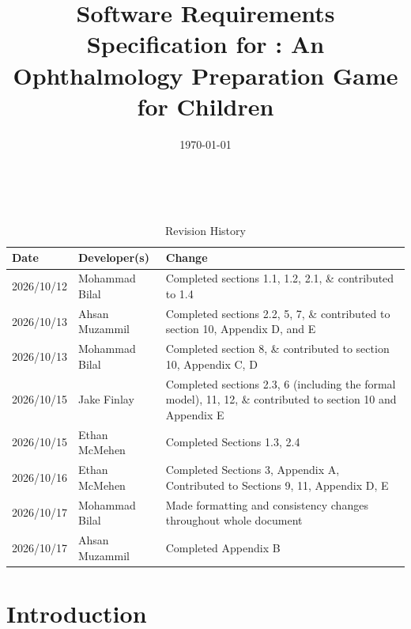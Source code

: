 \documentclass[10pt]{article}
\begin{document}
\title{Software Requirements Specification for \progname: An Ophthalmology Preparation Game for Children} 
\author{\authname}
\date{\today}
	
\maketitle

~\newpage


\tableofcontents

\newpage

\begin{table}[!htbp]
\caption{Revision History} \label{TblRevisionHistory}
\begin{tabularx}{\textwidth}{llX}
\toprule
\textbf{Date} & \textbf{Developer(s)} & \textbf{Change}\\
\midrule
2026/10/12 & Mohammad Bilal & Completed sections 1.1, 1.2, 2.1, \& contributed to 1.4 \\
2026/10/13 & Ahsan Muzammil & Completed sections 2.2, 5, 7, \& contributed to section 10, Appendix D, and E \\
2026/10/13 & Mohammad Bilal & Completed section 8, \& contributed to section 10, Appendix C, D \\
2026/10/15 & Jake Finlay & Completed sections 2.3, 6 (including the formal model), 11, 12, \& contributed to section 10 and Appendix E \\
2026/10/15 & Ethan McMehen & Completed Sections 1.3, 2.4 \\
2026/10/16 & Ethan McMehen & Completed Sections 3, Appendix A, Contributed to Sections 9, 11, Appendix D, E \\
2026/10/17 & Mohammad Bilal & Made formatting and consistency changes throughout whole document \\
2026/10/17 & Ahsan Muzammil & Completed Appendix B \\
\bottomrule
\end{tabularx}
\end{table}

\newpage


\section{Introduction} 
\end{document}
